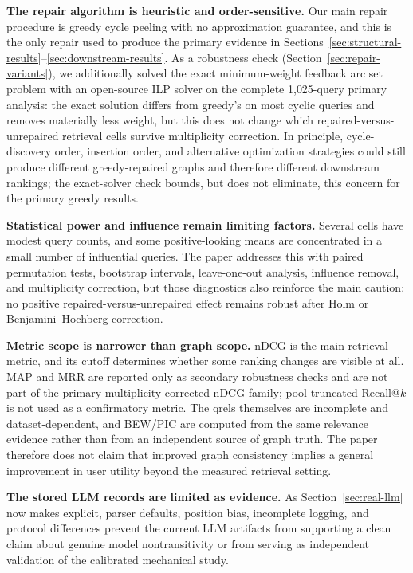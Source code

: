 \documentclass[manuscript,anonymous,review]{acmart}
\begin{document}
\textbf{The repair algorithm is heuristic and order-sensitive.} Our main repair
procedure is greedy cycle peeling with no approximation guarantee, and this is
the only repair used to produce the primary evidence in
Sections~\ref{sec:structural-results}--\ref{sec:downstream-results}. As a
robustness check (Section~\ref{sec:repair-variants}), we additionally solved
the exact minimum-weight feedback arc set problem with an open-source ILP
solver on the complete 1{,}025-query primary analysis: the exact solution
differs from greedy's on most cyclic queries and removes materially less
weight, but this does not change which repaired-versus-unrepaired retrieval
cells survive multiplicity correction. In principle, cycle-discovery order,
insertion order, and alternative optimization strategies could still produce
different greedy-repaired graphs and therefore different downstream rankings;
the exact-solver check bounds, but does not eliminate, this concern for the
primary greedy results.

\textbf{Statistical power and influence remain limiting factors.} Several cells
have modest query counts, and some positive-looking means are concentrated in a
small number of influential queries. The paper addresses this with paired
permutation tests, bootstrap intervals, leave-one-out analysis, influence
removal, and multiplicity correction, but those diagnostics also reinforce the
main caution: no positive repaired-versus-unrepaired effect remains robust after
Holm or Benjamini--Hochberg correction.

\textbf{Metric scope is narrower than graph scope.} nDCG is the main retrieval
metric, and its cutoff determines whether some ranking changes are visible at
all. MAP and MRR are reported only as secondary robustness checks and are not
part of the primary multiplicity-corrected nDCG family; pool-truncated
Recall@$k$ is not used as a confirmatory metric. The qrels themselves are
incomplete and dataset-dependent, and BEW/PIC are computed from the same
relevance evidence rather than from an independent source of graph truth. The
paper therefore does not claim that improved graph consistency implies a
general improvement in user utility beyond the measured retrieval setting.

\textbf{The stored LLM records are limited as evidence.} As Section~\ref{sec:real-llm}
now makes explicit, parser defaults, position bias, incomplete logging, and
protocol differences prevent the current LLM artifacts from supporting a clean
claim about genuine model nontransitivity or from serving as independent
validation of the calibrated mechanical study.
\end{document}
